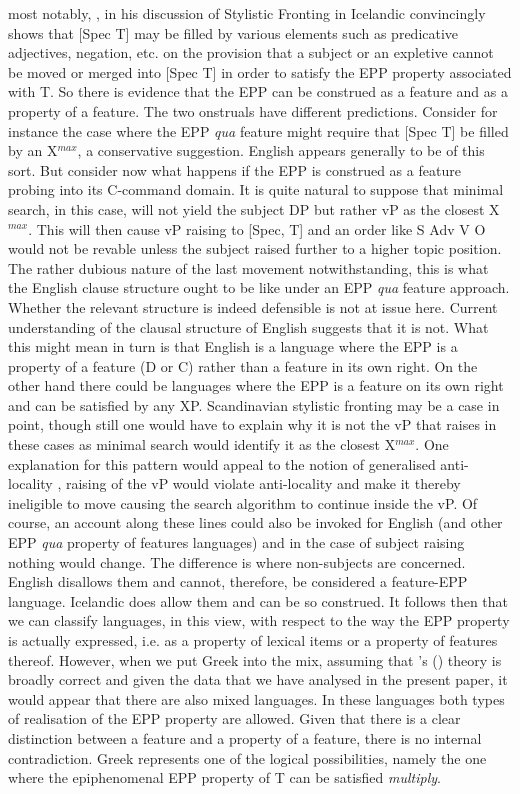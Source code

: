 \documentclass[11pt]{article}
\newcommand{\citeposs}[1]{\citeauthor{#1}'s (\citeyear{#1})}
\begin{document}
most notably, \citet{holmberg:00}, in his discussion of Stylistic Fronting in Icelandic convincingly shows that [Spec T] may be filled by various elements such as predicative adjectives, negation, etc. on the provision that a subject or an expletive cannot be moved or merged into [Spec T] in order to satisfy the EPP property associated with T. So there is evidence that the EPP can be construed as a feature and as a property of a feature.  The two onstruals have different predictions.  Consider for instance the case where the EPP \textit{qua} feature might require that [Spec T] be filled by an X$^{max}$, a conservative suggestion.  English appears generally to be of this sort.  But consider now what happens if the EPP is construed as a feature probing into its C-command domain.  It is quite natural to suppose that minimal search, in this case, will not yield the subject DP but rather vP as the closest X$^{max}$.  This will then cause vP raising to [Spec, T] and an order like S Adv V O would not be revable unless the subject raised further to a higher topic position.  The rather dubious nature of the last movement notwithstanding, this is what the English clause structure ought to be like under an EPP \textit{qua} feature approach. Whether the relevant structure is indeed defensible is not at issue here.  Current understanding of the clausal structure of English suggests that it is not.  What this might mean in turn is that English is a language where the EPP is a property of a feature (D or C) rather than a feature in its own right.  On the other hand there could be languages where the EPP is a feature on its own right and can be satisfied by any XP.  Scandinavian stylistic fronting may be a case in point, though still one would have to explain why it is not the vP that raises in these cases as minimal search would identify it as the closest X$^{max}$.
One explanation for this pattern would appeal to the notion of generalised anti-locality \citep[][et.seq]{abels:03}, raising of the vP would violate anti-locality and make it thereby ineligible to move causing the search algorithm to continue inside the vP.  Of course, an account along these lines could also be invoked for English (and other EPP \textit{qua} property of features languages) and in the case of subject raising nothing would change.  The difference is where non-subjects are concerned.   English disallows them and cannot, therefore, be considered a feature-EPP language.  Icelandic does allow them and can be so construed.  It follows then that we can classify languages, in this view, with respect to the way the EPP property is actually expressed, i.e. as a property of lexical items or a property of features thereof. However, when we put Greek into the mix, assuming that \citeposs{alexiadou-anagnostopoulou:98} theory is broadly correct and given the data that we have analysed in the present paper, it would appear that there are also mixed languages.  In these languages both types of realisation of the EPP property are allowed.  Given that there is a clear distinction between a feature and a property of a feature, there is no internal contradiction.  Greek represents one of the logical possibilities, namely the one where the epiphenomenal EPP property of T can be satisfied \textit{multiply}. 
\end{document}
